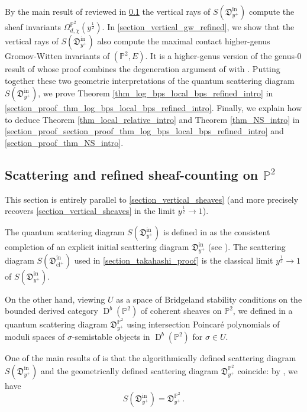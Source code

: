 \documentclass[11pt,letterpaper]{amsart}
\newcommand\PP{\mathbb P}
\newcommand\fD{\mathfrak D}
\newcommand\cl{\operatorname{cl}}
\newcommand\D{\operatorname{D}}
\newcommand\iin{\mathrm{in}}
\begin{document}
 
By the main result of \cite{bousseau2019scattering} 
reviewed in \cref{section_vertical_sheaves_refined} the vertical rays of 
$S(\fD^{\iin}_{y^+})$ compute the sheaf invariants $\Omega_{d,\chi}^{\PP^2}(y^{\frac{1}{2}})$.
In \cref{section_vertical_gw_refined}, we show that the vertical rays of 
$S(\fD^{\iin}_{y^+})$ also compute the maximal contact higher-genus
Gromov-Witten invariants of $(\PP^2,E)$.
It is a higher-genus version of the genus-$0$ result of \cite{gabele2019tropical}
whose proof combines the degeneration argument of \cite{gabele2019tropical} with 
\cite{MR3904449, bousseau2018quantum_tropical}.  
Putting together these two geometric interpretations of the quantum scattering diagram $S(\fD^{\iin}_{y^+})$, we prove 
Theorem \ref{thm_log_bps_local_bps_refined_intro} in \cref{section_proof_thm_log_bps_local_bps_refined_intro}. Finally, we explain how to deduce
Theorem \ref{thm_local_relative_intro}
and Theorem \ref{thm_NS_intro}
in \cref{section_proof_section_proof_thm_log_bps_local_bps_refined_intro}
and \cref{section_proof_thm_NS_intro}.




\subsection{Scattering and  refined sheaf-counting on $\PP^2$}
\label{section_vertical_sheaves_refined}

This section is entirely parallel to 
\cref{section_vertical_sheaves}
(and more precisely recovers \cref{section_vertical_sheaves} in the limit 
$y^{\frac{1}{2}} \rightarrow 1$).

The quantum scattering diagram $S(\fD^\iin_{y^+})$ is defined 
in \cite{bousseau2019scattering} as the consistent completion of an explicit initial 
scattering diagram $\fD^\iin_{y^+}$ (see \cite[Definition 1.4.8]{bousseau2019scattering}). The scattering diagram $S(\fD^\iin_{\cl^+})$ used
in \cref{section_takahashi_proof} is the classical limit $y^{\frac{1}{2}}
\rightarrow 1$ of $S(\fD^\iin_{y^+})$.

On the other hand, viewing $U$ as a space of Bridgeland stability conditions
on the bounded derived category $\D^b(\PP^2)$ of coherent sheaves on $\PP^2$, we defined in \cite[Definition 2.5.7]{bousseau2019scattering} a quantum scattering diagram
$\fD^{\PP^2}_{y^+}$ using intersection Poincar\'e polynomials of 
moduli spaces of $\sigma$-semistable objects in $\D^b(\PP^2)$ for $\sigma \in U$.

One of the main results of \cite{bousseau2019scattering} is that the algorithmically defined scattering diagram $S(\fD^\iin_{y^+})$ and the geometrically defined 
scattering diagram $\fD^{\PP^2}_{y^+}$ coincide: by 
\cite[Theorem 5.2.3]{bousseau2019scattering}, we have
\[ S(\fD^\iin_{y^+}) = \fD^{\PP^2}_{y^+} \,.\]
\end{document}
